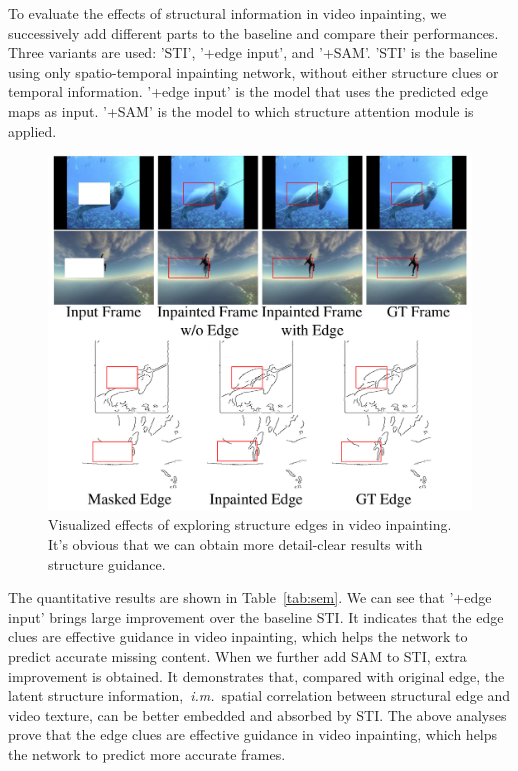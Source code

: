 To evaluate the effects of structural information in video inpainting, we successively add different parts to the baseline and compare their performances. Three variants are used: 'STI', '+edge input', and '+SAM'. 
'STI' is the baseline using only spatio-temporal inpainting network, without either structure clues or temporal information. '+edge input' is the model that uses the predicted edge maps as input. '+SAM' is the model to which structure attention module is applied.
\begin{figure}[!ht]
	\centering
	\includegraphics[width=0.97\columnwidth]{edgevis} %
	\caption{Visualized effects of exploring structure edges in video inpainting. It's obvious that we can obtain more detail-clear results with structure guidance.}
	\label{edgevis}
\end{figure}
The quantitative results are shown in Table~\ref{tab:sem}. 
We can see that '+edge input' brings large improvement over the baseline STI.
It indicates that the edge clues are effective guidance in video inpainting, which helps the network to predict accurate missing content.
When we further add SAM to STI, extra improvement is obtained.
It demonstrates that, compared with original edge, the latent structure information,~\emph{i.m.}~spatial correlation between structural edge and video texture, can be better embedded and absorbed by STI.
The above analyses prove that the edge clues are effective guidance in video inpainting, which helps the network to predict more accurate frames.

